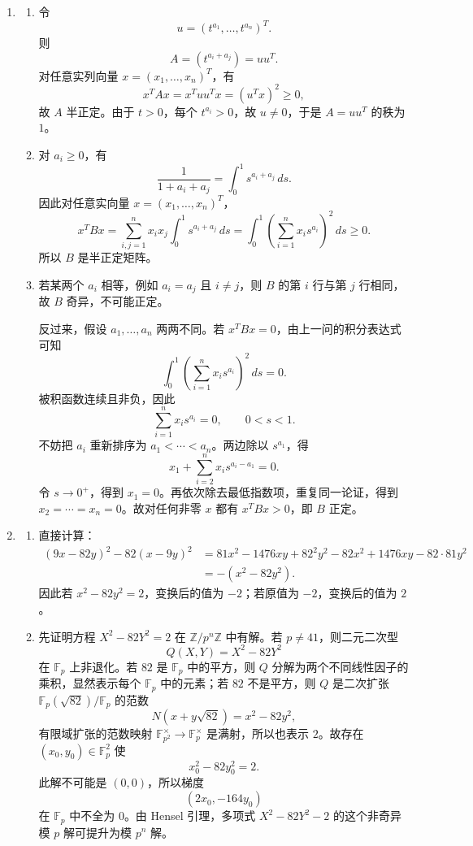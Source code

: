 \documentclass[UTF8,12pt]{ctexart}
\begin{document}
\begin{enumerate}[label=\textbf{\arabic*.},leftmargin=2.2em]
\item
\begin{enumerate}[label=\textbf{(\alph*)},leftmargin=2.4em]
\item 令
\[
u=(t^{a_1},\ldots,t^{a_n})^T.
\]
则
\[
A=(t^{a_i+a_j})=uu^T.
\]
对任意实列向量 \(x=(x_1,\ldots,x_n)^T\)，有
\[
x^T A x=x^Tuu^Tx=(u^Tx)^2\ge0,
\]
故 \(A\) 半正定。由于 \(t>0\)，每个 \(t^{a_i}>0\)，故 \(u\ne0\)，于是 \(A=uu^T\) 的秩为 \(1\)。

\item 对 \(a_i\ge0\)，有
\[
\frac1{1+a_i+a_j}=\int_0^1 s^{a_i+a_j}\,ds.
\]
因此对任意实向量 \(x=(x_1,\ldots,x_n)^T\)，
\[
x^TBx
=\sum_{i,j=1}^n x_i x_j\int_0^1 s^{a_i+a_j}\,ds
=\int_0^1\left(\sum_{i=1}^n x_i s^{a_i}\right)^2\,ds\ge0.
\]
所以 \(B\) 是半正定矩阵。

\item 若某两个 \(a_i\) 相等，例如 \(a_i=a_j\) 且 \(i\ne j\)，则 \(B\) 的第 \(i\) 行与第 \(j\) 行相同，故 \(B\) 奇异，不可能正定。

反过来，假设 \(a_1,\ldots,a_n\) 两两不同。若 \(x^TBx=0\)，由上一问的积分表达式可知
\[
\int_0^1\left(\sum_{i=1}^n x_i s^{a_i}\right)^2\,ds=0.
\]
被积函数连续且非负，因此
\[
\sum_{i=1}^n x_i s^{a_i}=0,
\qquad 0<s<1.
\]
不妨把 \(a_i\) 重新排序为 \(a_1<\cdots<a_n\)。两边除以 \(s^{a_1}\)，得
\[
x_1+\sum_{i=2}^n x_i s^{a_i-a_1}=0.
\]
令 \(s\to0^+\)，得到 \(x_1=0\)。再依次除去最低指数项，重复同一论证，得到 \(x_2=\cdots=x_n=0\)。故对任何非零 \(x\) 都有 \(x^TBx>0\)，即 \(B\) 正定。
\end{enumerate}

\item
\begin{enumerate}[label=\textbf{(\alph*)},leftmargin=2.4em]
\item 直接计算：
\[
\begin{aligned}
(9x-82y)^2-82(x-9y)^2
&=81x^2-1476xy+82^2y^2-82x^2+1476xy-82\cdot81y^2\\
&=-(x^2-82y^2).
\end{aligned}
\]
因此若 \(x^2-82y^2=2\)，变换后的值为 \(-2\)；若原值为 \(-2\)，变换后的值为 \(2\)。

\item 先证明方程 \(X^2-82Y^2=2\) 在 \(\mathbb Z/p^n\mathbb Z\) 中有解。若 \(p\ne41\)，则二元二次型
\[
Q(X,Y)=X^2-82Y^2
\]
在 \(\mathbb F_p\) 上非退化。若 \(82\) 是 \(\mathbb F_p\) 中的平方，则 \(Q\) 分解为两个不同线性因子的乘积，显然表示每个 \(\mathbb F_p\) 中的元素；若 \(82\) 不是平方，则 \(Q\) 是二次扩张 \(\mathbb F_p(\sqrt{82})/\mathbb F_p\) 的范数
\[
N(x+y\sqrt{82})=x^2-82y^2,
\]
有限域扩张的范数映射 \(\mathbb F_{p^2}^\times\to\mathbb F_p^\times\) 是满射，所以也表示 \(2\)。故存在 \((x_0,y_0)\in\mathbb F_p^2\) 使
\[
x_0^2-82y_0^2=2.
\]
此解不可能是 \((0,0)\)，所以梯度
\[
(2x_0,-164y_0)
\]
在 \(\mathbb F_p\) 中不全为 \(0\)。由 Hensel 引理，多项式 \(X^2-82Y^2-2\) 的这个非奇异模 \(p\) 解可提升为模 \(p^n\) 解。


\end{enumerate}
\end{enumerate}
\end{document}
